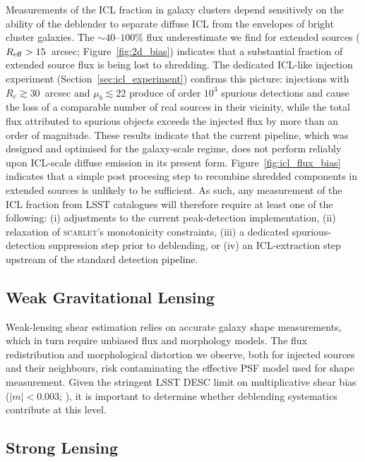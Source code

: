 \documentclass[DM,lsstdraft,authoryear,toc]{lsstdoc}
\newcommand{\Reff}{\ensuremath{R_{\rm eff}}\xspace}
\newcommand{\scarlet}{\textsc{scarlet}\xspace}
\begin{document}
Measurements of the ICL fraction in galaxy clusters
\citep[e.g.][]{Montes2019,Kluge2021} depend sensitively on the ability of
the deblender to separate diffuse ICL from the envelopes of bright cluster
galaxies. The ${\sim}40$--$100\%$ flux underestimate we find for extended
sources ($\Reff > 15$~arcsec; Figure~\ref{fig:2d_bias}) indicates that a
substantial fraction of extended source flux is being lost to shredding.
The dedicated ICL-like injection experiment
(Section~\ref{sec:icl_experiment}) confirms this picture:
injections with $R_e \gtrsim 30$~arcsec and $\mu_b \lesssim 22$ produce of
order $10^3$ spurious detections and cause the loss of a comparable number
of real sources in their vicinity, while the total flux attributed
to spurious objects exceeds the injected flux by more than an order of magnitude.
These results indicate that the current pipeline, which was designed and optimised
for the galaxy-scale regime, does not perform reliably upon ICL-scale diffuse
emission in its present form. Figure~\ref{fig:icl_flux_bias} indicates that
a simple post procesing step to recombine shredded components in extended sources is unlikely to be sufficient.
As such, any measurement of the ICL fraction from
LSST catalogues will therefore require at least one of the following:
(i) adjustments to the current peak-detection implementation,
(ii) relaxation of \scarlet's monotonicity constraints,
(iii) a dedicated spurious-detection suppression step prior to deblending, or
(iv) an ICL-extraction step upstream of the standard detection pipeline.

\subsection{Weak Gravitational Lensing}
\label{sec:implications_wl}

Weak-lensing shear estimation \citep[e.g.][]{SheldonHuff2017,Mandelbaum2018}
relies on accurate galaxy shape measurements, which in turn require unbiased flux
and morphology models. The flux redistribution and morphological distortion we
observe, both for injected sources and their neighbours, risk contaminating
the effective PSF model used for shape measurement. Given the stringent LSST DESC
limit on multiplicative shear bias ($|m| < 0.003$; \citealt{LSST_DESC2018}), it
is important to determine whether deblending systematics contribute at this level.

\subsection{Strong Lensing}
\label{sec:implications_sl}
\end{document}
